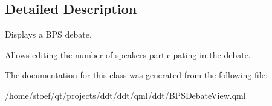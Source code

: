\subsection{Detailed Description}
Displays a B\-P\-S debate. 

Allows editing the number of speakers participating in the debate. 

The documentation for this class was generated from the following file\-:\begin{DoxyCompactItemize}
\item 
/home/stoef/qt/projects/ddt/ddt/qml/ddt/B\-P\-S\-Debate\-View.\-qml\end{DoxyCompactItemize}
